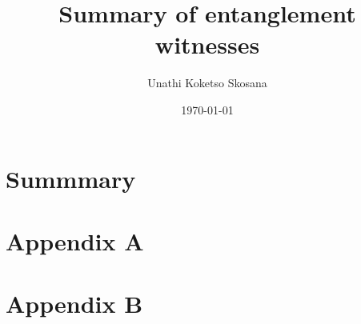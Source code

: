 \documentclass{article}
\title{Summary of entanglement witnesses}
\date{\today}
\author{Unathi Koketso Skosana}
\begin{document}
\maketitle

\section{Summmary}
\newpage{}
\appendix

\section*{Appendix A}
\section*{Appendix B}


\nocite{*}
\footnotesize{}
\end{document}
